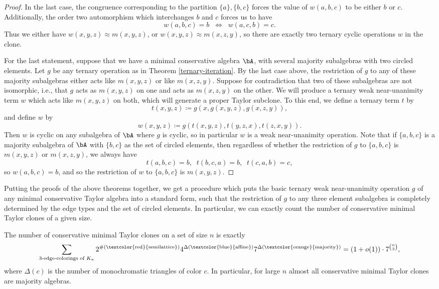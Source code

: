 \begin{proof}
In the last case, the congruence corresponding to the partition $\{a\},\{b,c\}$ forces the value of $w(a,b,c)$ to be either $b$ or $c$. Additionally, the order two automorphism which interchanges $b$ and $c$ forces us to have
\[
w(a,b,c) = b \;\; \iff \;\; w(a,c,b) = c.
\]
Thus we either have $w(x,y,z) \approx m(x,y,z)$, or $w(x,y,z) \approx m(x,z,y)$, so there are exactly two ternary cyclic operations $w$ in the clone.

For the last statement, suppose that we have a minimal conservative algebra $\bA$, with several majority subalgebras with two circled elements. Let $g$ be any ternary operation as in Theorem \ref{ternary-iteration}. By the last case above, the restriction of $g$ to any of these majority subalgebras either acts like $m(x,y,z)$ or like $m(x,z,y)$. Suppose for contradiction that two of these subalgebras are not isomorphic, i.e., that $g$ acts as $m(x,y,z)$ on one and acts as $m(x,z,y)$ on the other. We will produce a ternary weak near-unanimity term $w$ which acts like $m(x,y,z)$ on both, which will generate a proper Taylor subclone. To this end, we define a ternary term $t$ by
\[
t(x,y,z) \coloneqq g(x,g(x,y,z),g(x,z,y)),
\]
and define $w$ by
\[
w(x,y,z) \coloneqq g(t(x,y,z),t(y,z,x),t(z,x,y)).
\]
Then $w$ is cyclic on any subalgebra of $\bA$ where $g$ is cyclic, so in particular $w$ is a weak near-unanimity operation. Note that if $\{a,b,c\}$ is a majority subalgebra of $\bA$ with $\{b,c\}$ as the set of circled elements, then regardless of whether the restriction of $g$ to $\{a,b,c\}$ is $m(x,y,z)$ or $m(x,z,y)$, we always have
\[
t(a,b,c) = b, \;\; t(b,c,a) = b, \;\; t(c,a,b) = c,
\]
so $w(a,b,c) = b$, and so the restriction of $w$ to $\{a,b,c\}$ is $m(x,y,z)$.
\end{proof}

Putting the proofs of the above theorems together, we get a procedure which puts the basic ternary weak near-unanimity operation $g$ of any minimal conservative Taylor algebra into a standard form, such that the restriction of $g$ to any three element subalgebra is completely determined by the edge types and the set of circled elements. In particular, we can exactly count the number of conservative minimal Taylor clones of a given size.

\begin{cor} The number of conservative minimal Taylor clones on a set of size $n$ is exactly
\[
\sum_{3\text{-edge-colorings of }K_n} 2^{\#(\text{\textcolor{red}{semilattice}})}4^{\Delta(\text{\textcolor{blue}{affine}})}7^{\Delta(\text{\textcolor{orange}{majority}})} = (1+o(1))\cdot 7^{\binom{n}{3}},
\]
where $\Delta(c)$ is the number of monochromatic triangles of color $c$. In particular, for large $n$ almost all conservative minimal Taylor clones are majority algebras.
\end{cor}

